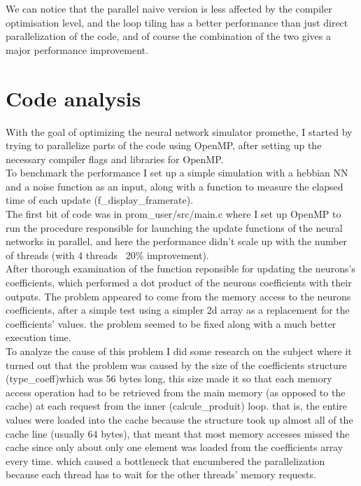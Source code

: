 \documentclass {article}
\begin{document}
We can notice that the parallel naive version is less affected by the compiler
optimisation level, and the loop tiling has a better performance than just
direct parallelization of the code, and of course the combination of the two
gives a major performance improvement.

\section{Code analysis}
With the goal of optimizing the neural network simulator promethe, I started by
trying to parallelize parts of the code using OpenMP, after setting up the
necessary compiler flags and libraries for OpenMP.\\

To benchmark the performance I set up a simple simulation with a hebbian NN
and a noise function as an input, along with a function to measure the elapsed
time of each update (f\_display\_framerate).\\

The first bit of code was in prom\_user/src/main.c where I set up OpenMP to run
the procedure responsible for launching the update functions of the neural
networks in parallel, and here the performance didn't scale up with the
number of threads (with 4 threads ~20\% improvement).\\

After thorough examination of the function reponsible for updating the
neurons's coefficients, which performed a dot product of the neurons
coefficients with their outputs. The problem appeared to come from the memory
access to the neurons coefficients, after a simple test using a simpler 2d
array as a replacement for the coefficients' values. the problem seemed to be
fixed along with a much better execution time.\\

To analyze the cause of this problem I did some research on the subject where
it turned out that the problem was caused by the size of the coefficients structure
(type\_coeff)which was 56 bytes long, this size made it so that each memory
access operation had to be retrieved from the main memory (as opposed to the
cache) at each request from the inner (calcule\_produit) loop. that is, the
entire values were loaded into the cache because the structure took up almost
all of the cache line (usually 64 bytes), that meant that most memory accesses
missed the cache since only about only one element was loaded from the
coefficients array every time. which caused a bottleneck that encumbered the
parallelization because each thread has to wait for the other threads' memory
requests.
\end{document}

